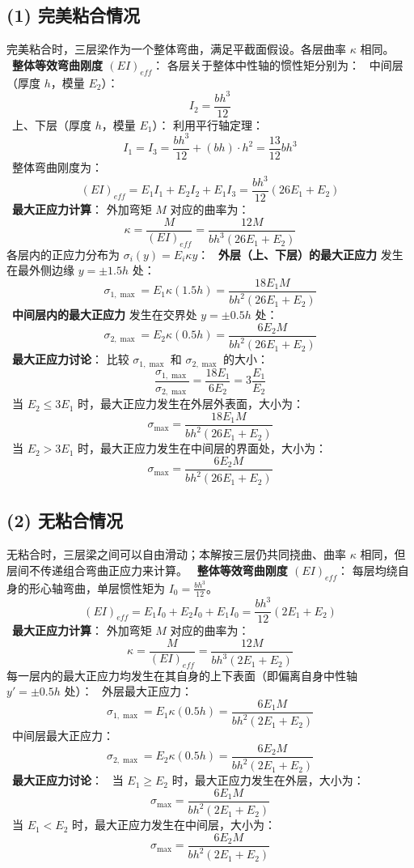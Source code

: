 \documentclass[11pt,a4paper]{ctexrep}
\begin{document}
{\subsection*{(1) 完美粘合情况}
完美粘合时，三层梁作为一个整体弯曲，满足平截面假设。各层曲率 $\kappa$ 相同。
\noindent\textbullet\ \textbf{整体等效弯曲刚度 $(EI)_{eff}$}：
  各层关于整体中性轴的惯性矩分别为：
\noindent\textbullet\ 中间层（厚度 $h$，模量 $E_2$）：
    \[
    I_2 = \frac{b h^3}{12}
    \]
\noindent\textbullet\ 上、下层（厚度 $h$，模量 $E_1$）：
    利用平行轴定理：
    \[
    I_1 = I_3 = \frac{b h^3}{12} + (bh) \cdot h^2 = \frac{13}{12} b h^3
    \]
\noindent\textbullet\ 整体弯曲刚度为：
    \[
    (EI)_{eff} = E_1 I_1 + E_2 I_2 + E_1 I_3 = \frac{b h^3}{12} (26 E_1 + E_2)
    \]
\noindent\textbullet\ \textbf{最大正应力计算}：
  外加弯矩 $M$ 对应的曲率为：
  \[
  \kappa = \frac{M}{(EI)_{eff}} = \frac{12 M}{b h^3 (26 E_1 + E_2)}
  \]
  各层内的正应力分布为 $\sigma_i(y) = E_i \kappa y$：
\noindent\textbullet\ \textbf{外层（上、下层）的最大正应力} 发生在最外侧边缘 $y = \pm 1.5 h$ 处：
    \[
    \sigma_{1,\max} = E_1 \kappa (1.5 h) = \frac{18 E_1 M}{b h^2 (26 E_1 + E_2)}
    \]
\noindent\textbullet\ \textbf{中间层内的最大正应力} 发生在交界处 $y = \pm 0.5 h$ 处：
    \[
    \sigma_{2,\max} = E_2 \kappa (0.5 h) = \frac{6 E_2 M}{b h^2 (26 E_1 + E_2)}
    \]
\noindent\textbullet\ \textbf{最大正应力讨论}：
    比较 $\sigma_{1,\max}$ 和 $\sigma_{2,\max}$ 的大小：
    \[
    \frac{\sigma_{1,\max}}{\sigma_{2,\max}} = \frac{18 E_1}{6 E_2} = 3 \frac{E_1}{E_2}
    \]
\noindent\textbullet\ 当 $E_2 \le 3 E_1$ 时，最大正应力发生在外层外表面，大小为：
      \[
      \sigma_{\max} = \frac{18 E_1 M}{b h^2 (26 E_1 + E_2)}
      \]
\noindent\textbullet\ 当 $E_2 > 3 E_1$ 时，最大正应力发生在中间层的界面处，大小为：
      \[
      \sigma_{\max} = \frac{6 E_2 M}{b h^2 (26 E_1 + E_2)}
      \]

\subsection*{(2) 无粘合情况}
无粘合时，三层梁之间可以自由滑动；本解按三层仍共同挠曲、曲率 $\kappa$ 相同，但层间不传递组合弯曲正应力来计算。
\noindent\textbullet\ \textbf{整体等效弯曲刚度 $(EI)_{eff}$}：
  每层均绕自身的形心轴弯曲，单层惯性矩为 $I_0 = \frac{b h^3}{12}$。
  \[
  (EI)_{eff} = E_1 I_0 + E_2 I_0 + E_1 I_0 = \frac{b h^3}{12} (2 E_1 + E_2)
  \]
\noindent\textbullet\ \textbf{最大正应力计算}：
  外加弯矩 $M$ 对应的曲率为：
  \[
  \kappa = \frac{M}{(EI)_{eff}} = \frac{12 M}{b h^3 (2 E_1 + E_2)}
  \]
  每一层内的最大正应力均发生在其自身的上下表面（即偏离自身中性轴 $y' = \pm 0.5 h$ 处）：
\noindent\textbullet\ 外层最大正应力：
    \[
    \sigma_{1,\max} = E_1 \kappa (0.5 h) = \frac{6 E_1 M}{b h^2 (2 E_1 + E_2)}
    \]
\noindent\textbullet\ 中间层最大正应力：
    \[
    \sigma_{2,\max} = E_2 \kappa (0.5 h) = \frac{6 E_2 M}{b h^2 (2 E_1 + E_2)}
    \]
\noindent\textbullet\ \textbf{最大正应力讨论}：
\noindent\textbullet\ 当 $E_1 \ge E_2$ 时，最大正应力发生在外层，大小为：
      \[
      \sigma_{\max} = \frac{6 E_1 M}{b h^2 (2 E_1 + E_2)}
      \]
\noindent\textbullet\ 当 $E_1 < E_2$ 时，最大正应力发生在中间层，大小为：
      \[
      \sigma_{\max} = \frac{6 E_2 M}{b h^2 (2 E_1 + E_2)}
      \]


}
\end{document}
